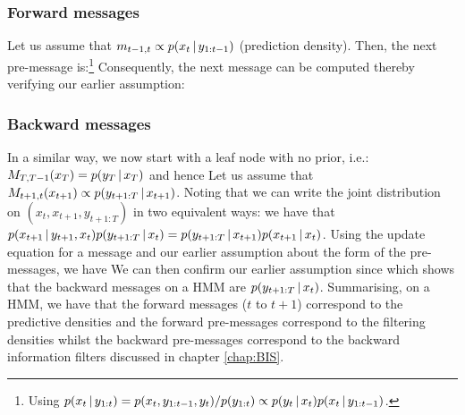\subsubsection{Forward messages}
Let us assume that $m_{t-1, t} \propto p(x_{t}\,|\, y_{1:t-1})$ (prediction density). Then, the next pre-message is:\footnote{Using $p(x_{t}\,|\, y_{1:t})= p(x_{t},y_{1:t-1},y_{t})/p(y_{1:t})\propto p(y_{t}\,|\, x_{t})p(x_{t}\,|\, y_{1:t-1})$.}
Consequently, the next message can be computed thereby verifying our earlier assumption:
%
%
\subsubsection{Backward messages}
In a similar way, we now start with a leaf node with no prior, i.e.: $M_{T,T-1}(x_{T})=p(y_{T}\,|\, x_{T})$ and hence
%
%
Let us assume that $M_{t+1, t}(x_{t+1}) \propto p(y_{t+1:T}\,|\, x_{t+1})$. Noting that we can write the joint distribution on $(x_{t},x_{t+1}, y_{t+1:T})$ in two equivalent ways:
%
%
we have that $p(x_{t+1}\,|\, y_{t+1},x_{t})p(y_{t+1:T}\,|\, x_{t}) = p(y_{t+1:T}\,|\, x_{t+1})p(x_{t+1}\,|\, x_{t})$. Using the update equation for a message and our earlier assumption about the form of the pre-messages, we have
%
%
We can then confirm our earlier assumption since
which shows that the backward messages on a HMM are  $p(y_{t+1:T}\,|\, x_{t})$.
Summarising, on a HMM, we have that the forward messages ($t$ to $t+1$) correspond to the predictive densities and the forward pre-messages correspond to the filtering densities whilst the backward pre-messages correspond to the backward information filters discussed in chapter \ref{chap:BIS}.

